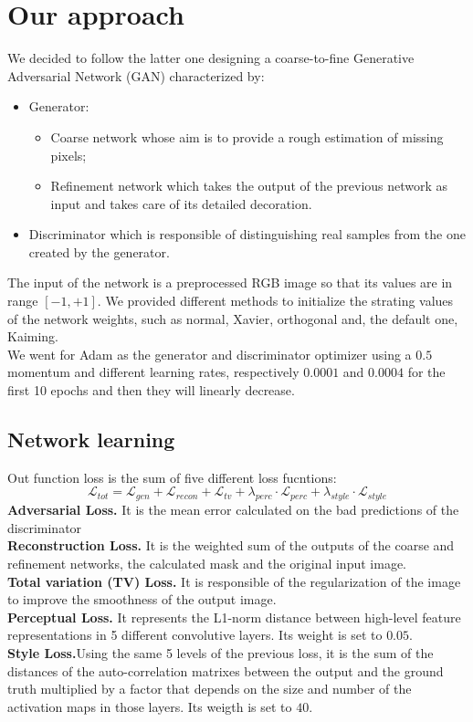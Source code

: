 \documentclass[10pt,twocolumn,letterpaper]{article}
\begin{document}
	\section{Our approach}
	We decided to follow the latter one designing a coarse-to-fine Generative Adversarial Network (GAN) characterized by:
	\begin{itemize}
		\item
		Generator:
		\begin{itemize}
			\item 
			Coarse network whose aim is to provide a rough estimation of missing pixels;
			\item
			Refinement network which takes the output of the previous network as input and takes care of its detailed decoration.
		\end{itemize}
		\item
		Discriminator which is responsible of distinguishing real samples from the one created by the generator.
	\end{itemize}
	The input of the network is a preprocessed RGB image so that its values are in range \([-1,+1]\).
	We provided different methods to initialize the strating values of the network weights, such as normal, Xavier, orthogonal and, the default one, Kaiming.
	\\
	We went for Adam as the generator and discriminator optimizer using a \(0.5\) momentum and different learning rates, respectively \(0.0001\) and \(0.0004\) for the first 10 epochs and then they will linearly decrease.
	\subsection{Network learning}
	Out function loss is the sum of five different loss fucntions:
	\begin{equation}
		\mathcal{L}_{tot} = \mathcal{L}_{gen} + \mathcal{L}_{recon} + \mathcal{L}_{tv} + \lambda_{perc} \cdot \mathcal{L}_{perc} + \lambda_{style} \cdot \mathcal{L}_{style}
	\end{equation}
	\textbf{Adversarial Loss.} It is the mean error calculated on the bad predictions of the discriminator
	\\
	\textbf{Reconstruction Loss.} It is the weighted sum of the outputs of the coarse and refinement networks, the calculated mask and the original input image.
	\\
	\textbf{Total variation (TV) Loss.} It is responsible of the regularization of the image to improve the smoothness of the output image.
	\\
	\textbf{Perceptual Loss.} It represents the L1-norm distance between high-level feature representations in 5 different convolutive layers. Its weight is set to \(0.05\).
	\\
	\textbf{Style Loss.}Using the same 5 levels of the previous loss, it is the sum of the distances of the auto-correlation matrixes between the output and the ground truth multiplied by a factor that depends on the size and number of the activation maps in those layers. Its weigth is set to \(40\).
	\\
\end{document}

